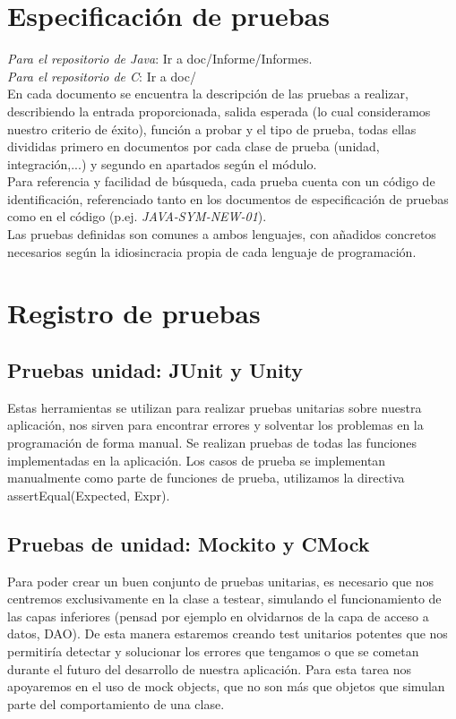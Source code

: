 \documentclass[DIV=calc,paper=a4,fontsize=11pt,onecolumn]{scrartcl} %
\begin{document}
\section{Especificación de pruebas}

\textit{Para el repositorio de Java}: Ir a doc/Informe/Informes. \\

\textit{Para el repositorio de C}: Ir a doc/ \\

En cada documento se encuentra la descripción de las pruebas a realizar, describiendo la entrada proporcionada, salida esperada (lo cual consideramos nuestro criterio de éxito), función a probar y el tipo de prueba, todas ellas divididas primero en documentos por cada clase de prueba (unidad, integración,...) y segundo en apartados según el módulo. \\

Para referencia y facilidad de búsqueda, cada prueba cuenta con un código de identificación, referenciado tanto en los documentos de especificación de pruebas como en el código (p.ej. \textit{JAVA-SYM-NEW-01}). \\

Las pruebas definidas son comunes a ambos lenguajes, con añadidos concretos necesarios según la idiosincracia propia de cada lenguaje de programación. \\

\section{Registro de pruebas}
\subsection{Pruebas unidad: JUnit y Unity}
Estas herramientas se utilizan para realizar pruebas unitarias sobre nuestra aplicación, nos sirven para encontrar errores y solventar los problemas en la programación de forma manual.
Se realizan pruebas de todas las funciones implementadas en la aplicación.
Los casos de prueba se implementan manualmente como parte de funciones de prueba, utilizamos la directiva assertEqual(Expected, Expr).

\subsection{Pruebas de unidad: Mockito y CMock}
Para poder crear un buen conjunto de pruebas unitarias, es necesario que nos centremos exclusivamente en la clase a testear, simulando el funcionamiento de las capas inferiores (pensad por ejemplo en olvidarnos de la capa de acceso a datos, DAO). De esta manera estaremos creando test unitarios potentes que nos permitiría detectar y solucionar los errores que tengamos o que se cometan durante el futuro del desarrollo de nuestra aplicación.
Para esta tarea nos apoyaremos en el uso de mock objects, que no son más que objetos que simulan parte del comportamiento de una clase. \\
\end{document}
